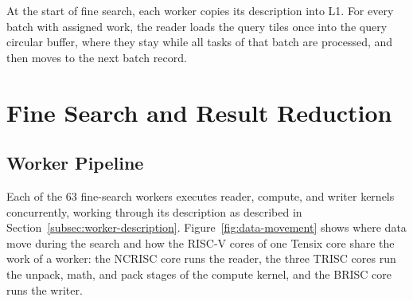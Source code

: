 At the start of fine search, each worker copies its description into L1. For
every batch with assigned work, the reader loads the query tiles once into the
query circular buffer, where they stay while all tasks of that batch are
processed, and then moves to the next batch record.

\section{Fine Search and Result Reduction}
\label{sec:fine-search-and-reduction}

\subsection{Worker Pipeline}
\label{subsec:fine-worker-pipeline}

Each of the 63 fine-search workers executes reader, compute, and writer kernels concurrently, working through its description as described in Section~\ref{subsec:worker-description}. Figure~\ref{fig:data-movement} shows where data move during the search and how the RISC-V cores of one Tensix core share the work of a worker: the NCRISC core runs the reader, the three TRISC cores run the unpack, math, and pack stages of the compute kernel, and the BRISC core runs the writer.


